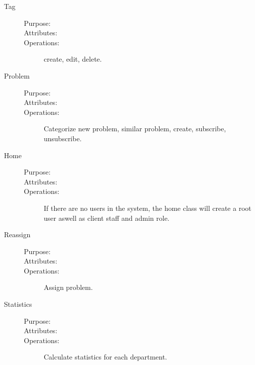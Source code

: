 \begin{description}
\item[Tag]\hfill
\begin{description}
\item[Purpose:]
\item[Attributes:]
\item[Operations:]create, edit, delete.
\end{description}
\end{description}

\begin{description}
\item[Problem]\hfill
\begin{description}
\item[Purpose:]
\item[Attributes:]
\item[Operations:]Categorize new problem, similar problem, create, subscribe, unsubscribe.
\end{description}
\end{description}

\begin{description}
\item[Home]\hfill
\begin{description}
\item[Purpose:]
\item[Attributes:]
\item[Operations:] If there are no users in the system, the home class will create a root user aswell as client staff and admin role.
\end{description}
\end{description}

\begin{description}
\item[Reassign]\hfill
\begin{description}
\item[Purpose:]
\item[Attributes:]
\item[Operations:] Assign problem.
\end{description}
\end{description}

\begin{description}
\item[Statistics]\hfill
\begin{description}
\item[Purpose:]
\item[Attributes:]
\item[Operations:] Calculate statistics for each department.
\end{description}
\end{description}